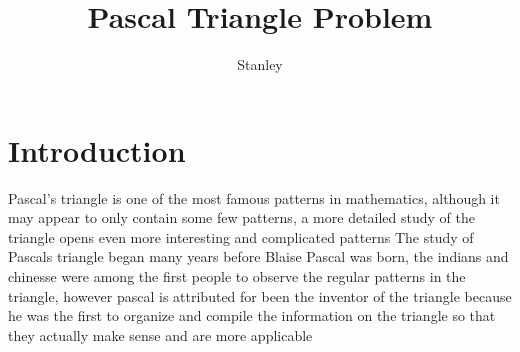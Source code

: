 \documentclass[10pt,a4paper]{article}
\author{Stanley}
\title{Pascal Triangle Problem}
\begin{document}
\maketitle



\newpage
\section{Introduction}
Pascal's triangle is one of the most famous patterns in mathematics, although it may appear to only contain some few patterns, a more detailed study of the triangle opens even more interesting and complicated patterns The study of Pascals triangle began many years before Blaise Pascal was born, the indians and chinesse were among the first people to observe the regular patterns in the triangle, however pascal is attributed for  been the inventor of the triangle because he was the first to organize and compile the information on the triangle so that they actually make sense and are more applicable
\end{document}
